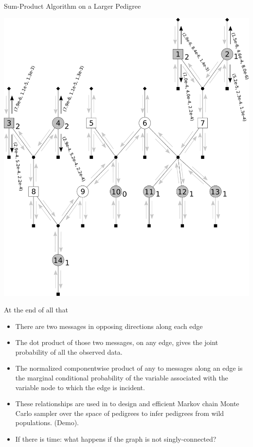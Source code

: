 \documentclass[letter,graphicx]{beamer}
\begin{document}
\begin{frame}{Sum-Product Algorithm on a Larger Pedigree} 
\begin{center} 
\includegraphics[height = 0.8\textheight]{./images/mg-example-step12.pdf}
\end{center}
\end{frame}

\begin{frame}{At the end of all that}
\begin{itemize}
\item There are two messages in opposing directions along each edge
\item The dot product of those two messages, on any edge, gives the joint
probability of all the observed data.
\item The normalized componentwise product of any to messages along an edge
is the marginal conditional probability of the variable associated with the
variable node to which the edge is incident.
\item These relationships are used in \citet{anderson2016bayesian} to design
and efficient Markov chain Monte Carlo sampler over the space of pedigrees to infer pedigrees from wild populations.  (Demo).
\item If there is time: what happens if the graph is not singly-connected?
\end{itemize}
\end{frame}
\end{document}

